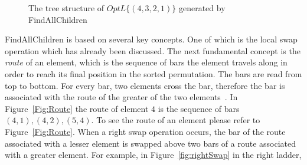 \begin{figure}[h]
	\caption{The tree structure of $OptL\{(4,3,2,1)\}$ generated by {\sc FindAllChildren}}
	\label{Fig:TreeFAC}
\end{figure}
\pagebreak
{\sc FindAllChildren} is based on several key concepts. One of which is the local swap operation 
which has already been discussed. The next fundamental concept is the \emph{route} of an element, 
which is the sequence of bars the element travels along in order to reach its final position in the 
sorted permutation. The bars are read from top to bottom. For every bar, two elements cross 
the bar, therefore the bar is associated with the route of the greater of the two elements~\cite{A1}. 
In Figure~\ref{Fig:Route} the route of element $4$ is the sequence of bars 
$(4,1),(4,2),(5,4)$. To see the route of an element please refer to Figure~\ref{Fig:Route}. When a 
right swap operation occurs, the bar of the route associated with a lesser element is 
swapped above two bars of a route associated with a greater element. For example, in Figure~\ref{fig:rightSwap} in the right ladder, 
